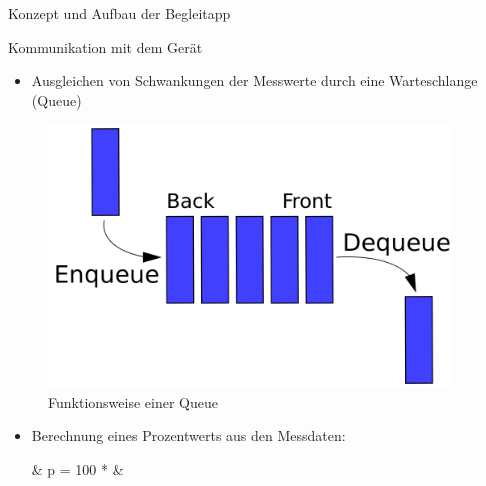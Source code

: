 \documentclass[final,20pt]{beamer}
\newlength{\sepwidth}
\newlength{\colwidth}
\newcommand{\separatorcolumn}{\begin{column}{\sepwidth}\end{column}}
\begin{document}
\begin{frame}[t]
\begin{columns}[t]
\separatorcolumn
\begin{column}{\colwidth}  
	
	\begin{alertblock}{Konzept und Aufbau der Begleitapp}
		\begin{figure}[H]
			\centering
			
		\end{figure}
	\end{alertblock}

	\begin{alertblock}{Kommunikation mit dem Gerät}
		\begin{itemize}
			\item Ausgleichen von Schwankungen der Messwerte durch eine Warteschlange (Queue)
		\end{itemize}
		\begin{figure}[H]
			\centering
			\includegraphics[width=0.5\colwidth]{pics/queue}
			\caption{Funktionsweise einer Queue}
			\label{fig:queue}
		\end{figure}
		\begin{itemize}
			\item Berechnung eines Prozentwerts aus den Messdaten:
			\begin{flalign*}
			& p = 100 * &
			\end{flalign*}
		\end{itemize}
	\end{alertblock}


\end{column}
\end{columns}
\end{frame}
\end{document}
